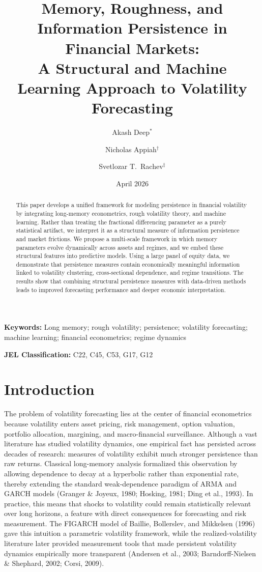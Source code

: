\documentclass[12pt]{article}
\title{\textbf{Memory, Roughness, and Information Persistence in Financial Markets:\\[6pt]
A Structural and Machine Learning Approach to Volatility Forecasting}}
\author{Akash Deep$^{*}$ \and Nicholas Appiah$^{\dagger}$ \and Svetlozar T.\ Rachev$^{\ddagger}$}
\date{April 2026}
\begin{document}
\maketitle

\begin{abstract}
This paper develops a unified framework for modeling persistence in financial volatility by integrating long-memory econometrics, rough volatility theory, and machine learning. Rather than treating the fractional differencing parameter as a purely statistical artifact, we interpret it as a structural measure of information persistence and market frictions. We propose a multi-scale framework in which memory parameters evolve dynamically across assets and regimes, and we embed these structural features into predictive models. Using a large panel of equity data, we demonstrate that persistence measures contain economically meaningful information linked to volatility clustering, cross-sectional dependence, and regime transitions. The results show that combining structural persistence measures with data-driven methods leads to improved forecasting performance and deeper economic interpretation.
\end{abstract}

\noindent\textbf{Keywords:} Long memory; rough volatility; persistence; volatility forecasting; machine learning; financial econometrics; regime dynamics

\smallskip
\noindent\textbf{JEL Classification:} C22, C45, C53, G17, G12

\newpage
\tableofcontents
\newpage

\section{Introduction}
\label{sec:intro}

The problem of volatility forecasting lies at the center of financial econometrics because volatility enters asset pricing, risk management, option valuation, portfolio allocation, margining, and macro-financial surveillance. Although a vast literature has studied volatility dynamics, one empirical fact has persisted across decades of research: measures of volatility exhibit much stronger persistence than raw returns. Classical long-memory analysis formalized this observation by allowing dependence to decay at a hyperbolic rather than exponential rate, thereby extending the standard weak-dependence paradigm of ARMA and GARCH models (Granger \& Joyeux, 1980; Hosking, 1981; Ding et al., 1993). In practice, this means that shocks to volatility could remain statistically relevant over long horizons, a feature with direct consequences for forecasting and risk measurement. The FIGARCH model of Baillie, Bollerslev, and Mikkelsen (1996) gave this intuition a parametric volatility framework, while the realized-volatility literature later provided measurement tools that made persistent volatility dynamics empirically more transparent (Andersen et al., 2003; Barndorff-Nielsen \& Shephard, 2002; Corsi, 2009).
\end{document}
